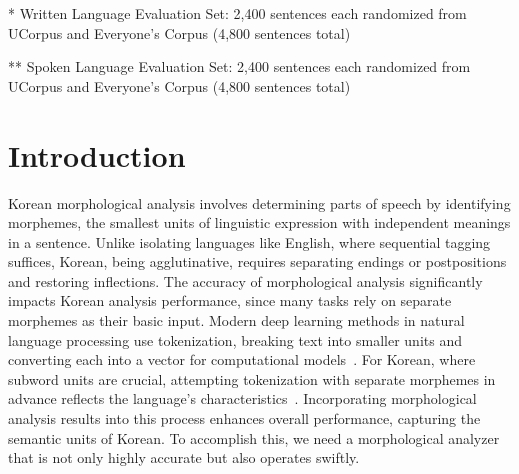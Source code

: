 \documentclass[AMS,STIX2COL]{WileyNJD-v2}
\begin{document}
\begin{table}[ht]
\begin{tabular*}{500pt}{@{\extracolsep\fill}cccD{.}{.}{3}c@{\extracolsep\fill}}
            \bottomrule
        \end{tabular*}
        \begin{tablenotes}
            \footnotesize
            \item\hspace{2mm} * Written Language Evaluation Set: 2,400 sentences each randomized from UCorpus and Everyone's Corpus (4,800 sentences total)
            \item\hspace{2mm} ** Spoken Language Evaluation Set: 2,400 sentences each randomized from UCorpus and Everyone's Corpus (4,800 sentences total)
        \end{tablenotes}
    \end{table}

    \section{Introduction}\label{sec:intro}

    Korean morphological analysis involves determining parts of speech by identifying morphemes, the smallest units of linguistic expression with independent meanings in a sentence.
    Unlike isolating languages like English, where sequential tagging suffices, Korean, being agglutinative, requires separating endings or postpositions and restoring inflections.
    The accuracy of morphological analysis significantly impacts Korean analysis performance, since many tasks rely on separate morphemes as their basic input.
    Modern deep learning methods in natural language processing use tokenization, breaking text into smaller units and converting each into a vector for computational models~\cite{Mikolov2013}.
    For Korean, where subword units are crucial, attempting tokenization with separate morphemes in advance reflects the language's characteristics~\cite{SongHJ2021}.
    Incorporating morphological analysis results into this process enhances overall performance, capturing the semantic units of Korean.
    To accomplish this, we need a morphological analyzer that is not only highly accurate but also operates swiftly.
\end{document}
